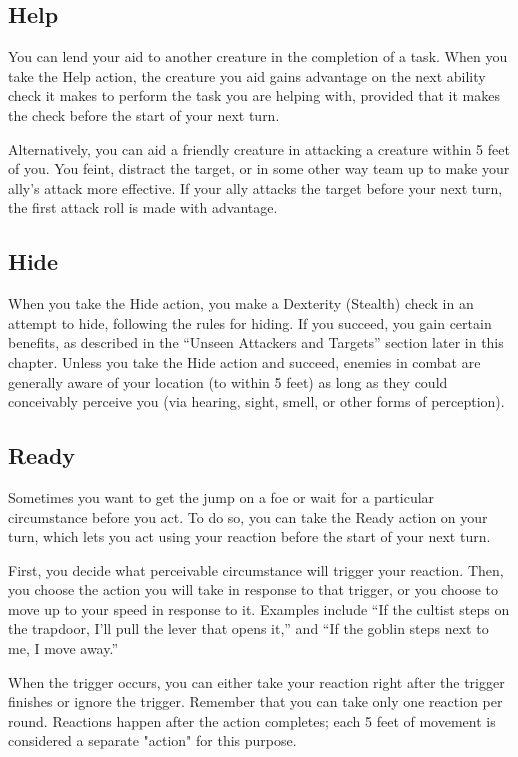 \subsection{Help}

You can lend your aid to another creature in the completion of a task. When you take the Help action, the creature you aid gains advantage on the next ability check it makes to perform the task you are helping with, provided that it makes the check before the start of your next turn.

Alternatively, you can aid a friendly creature in attacking a creature within 5 feet of you. You feint, distract the target, or in some other way team up to make your ally's attack more effective. If your ally attacks the target before your next turn, the first attack roll is made with advantage.

\subsection{Hide}

When you take the Hide action, you make a Dexterity (Stealth) check in an attempt to hide, following the rules for hiding. If you succeed, you gain certain benefits, as described in the “Unseen Attackers and Targets” section later in this chapter. Unless you take the Hide action and succeed, enemies in combat are generally aware of your location (to within 5 feet) as long as they could conceivably perceive you (via hearing, sight, smell, or other forms of perception).

\subsection{Ready}

Sometimes you want to get the jump on a foe or wait for a particular circumstance before you act. To do so, you can take the Ready action on your turn, which lets you act using your reaction before the start of your next turn.

First, you decide what perceivable circumstance will trigger your reaction. Then, you choose the action you will take in response to that trigger, or you choose to move up to your speed in response to it. Examples include “If the cultist steps on the trapdoor, I'll pull the lever that opens it,” and “If the goblin steps next to me, I move away.”

When the trigger occurs, you can either take your reaction right after the trigger finishes or ignore the trigger. Remember that you can take only one reaction per round. Reactions happen after the action completes; each 5 feet of movement is considered a separate "action" for this purpose.

